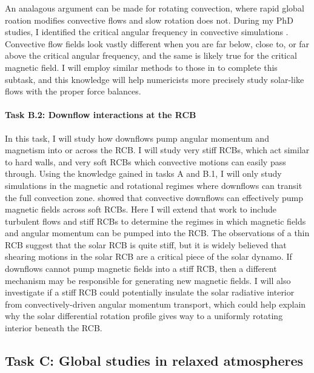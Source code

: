 \documentclass[11pt, preprint]{aastex}
\begin{document}
An analagous argument can be made for rotating convection, where rapid global roation modifies convective flows and slow rotation does not.
During my PhD studies, I identified the critical angular frequency in convective simulations \citep[][and Fig. \ref{fig:rossby_plot}]{anders&all2019}.
Convective flow fields look vastly different when you are far below, close to, or far above the critical angular frequency, and the same is likely true for the critical magnetic field.
I will employ similar methods to those in \citet{anders&all2019} to complete this subtask, and this knowledge will help numericists more precisely study solar-like flows with the proper force balances.

\vspace{-0.7cm}
\paragraph{Task B.2: Downflow interactions at the RCB}
\label{sct:taskB2}
In this task, I will study how downflows pump angular momentum and magnetism into or across the RCB.
I will study very stiff RCBs, which act similar to hard walls, and very soft RCBs which convective motions can easily pass through.
Using the knowledge gained in tasks A and B.1, I will only study simulations in the magnetic and rotational regimes where downflows can transit the full convection zone.
\citet{tobias&all1998} showed that convective downflows can effectively pump magnetic fields across soft RCBs.
Here I will extend that work to include turbulent flows and stiff RCBs to determine the regimes in which magnetic fields and angular momentum can be pumped into the RCB.
The observations of a thin RCB \citep{basu1997} suggest that the solar RCB is quite stiff, but it is widely believed that shearing motions in the solar RCB are a critical piece of the solar dynamo.
If downflows cannot pump magnetic fields into a stiff RCB, then a different mechanism may be responsible for generating new magnetic fields.
I will also investigate if a stiff RCB could potentially insulate the solar radiative interior from convectively-driven angular momentum transport, which could help explain why the solar differential rotation profile gives way to a uniformly rotating interior beneath the RCB.

\newpage
\subsection*{Task C: Global studies in relaxed atmospheres}
\vspace{-0.3cm}
\label{sct:taskC}
\end{document}
